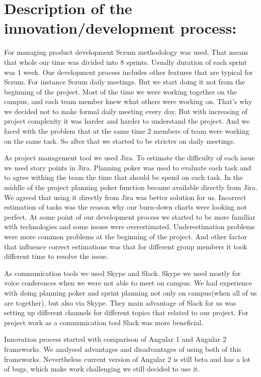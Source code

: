 \section {Description of the innovation/development process:}
For managing product development Scrum methodology was used. That means that whole our time was divided into 8 sprints. Usually duration of each sprint was 1 week. Our development process includes other features that are typical for Scrum. For instance Scrum daily meetings. But we start doing it not from the beginning of the project. Most of the time we were working together on the campus, and each team member knew what others were working on. That's why we decided not to make formal daily meeting every day. But with increasing of project complexity it was harder and harder to understand the project. And we faced with the problem that at the same time 2 members of team were working on the same task. So after that we started to be stricter on daily meetings. 
\par
As project management tool we used Jira. To estimate the difficulty of each issue we used story points in Jira. Planning poker was used to evaluate each task and to agree withing the team the time that should be spend on each task. In the middle of the project planning poker function became available directly from Jira. We agreed that using it directly from Jira was better solution for us. Incorrect estimation of tasks was the reason why our burn-down charts were looking not perfect. At some point of our development process we started to be more familiar with technologies and some issues were overestimated. Underestimation problems were more common problems at the beginning of the project. And other factor that influence correct estimations was that for different group members it took different time to resolve the issue.
\par
As communication tools we used Skype and Slack. Skype we used mostly for voice conferences when we were not able to meet on campus. We had experience with doing planning poker and sprint planning not only on campus(when all of us are together), but also via Skype. They main advantage of Slack for us was setting up different channels for different topics that related to our project. For project work as a communication tool Slack was more beneficial.
\par
Innovation process started with comparison of Angular 1 and Angular 2 frameworks. We analysed advantages and disadvantages of using both of this frameworks. Nevertheless current version of Angular 2 is still beta and has a lot of bugs, which make work challenging we still decided to use it. 




